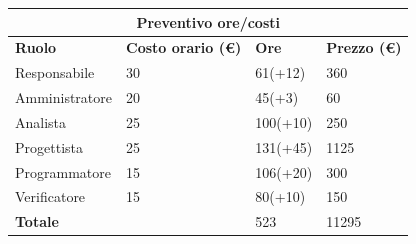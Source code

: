 \documentclass[a4paper, 12pt]{article}
\begin{document}
\begin{center}
	\begin{tabularx}{\textwidth}{|X|X|X|X|}
		\hline
		\multicolumn{4}{|c|}{\textbf{Preventivo ore/costi}}                                      \\
		\hline
		\hline
		\textbf{Ruolo}  & \textbf{Costo orario (\euro)} & \textbf{Ore} & \textbf{Prezzo (\euro)} \\
		\hline
		Responsabile    & 30                            & 61(+12)       & 360                      \\
		\hline
		Amministratore  & 20                            & 45(+3)       & 60                      \\
		\hline
		Analista        & 25                            & 100(+10)       & 250                     \\
		\hline
		Progettista     & 25                            & 131(+45)       & 1125                     \\
		\hline
		Programmatore   & 15                            & 106(+20)      & 300                    \\
		\hline
		Verificatore    & 15                            & 80(+10)       & 150                      \\
		\hline
		\hline
		\textbf{Totale} &                               & 523          & 11295                    \\
		\hline
	\end{tabularx}\\[8pt]
	\mbox{}\\
\end{center}
\end{document}

